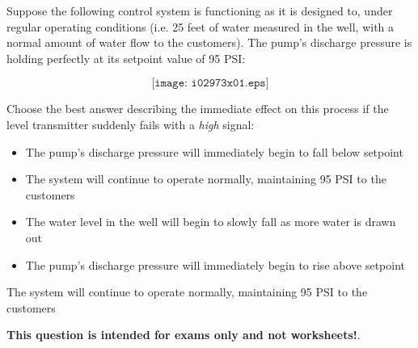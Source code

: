 

Suppose the following control system is functioning as it is designed to, under regular operating conditions (i.e. 25 feet of water measured in the well, with a normal amount of water flow to the customers).  The pump's discharge pressure is holding perfectly at its setpoint value of 95 PSI:

$$\texttt{[image: i02973x01.eps]}$$

\noindent
Choose the best answer describing the immediate effect on this process if the level transmitter suddenly fails with a {\it high} signal:

\begin{itemize}
\item{} The pump's discharge pressure will immediately begin to fall below setpoint
\vskip 10pt
\item{} The system will continue to operate normally, maintaining 95 PSI to the customers
\vskip 10pt
\item{} The water level in the well will begin to slowly fall as more water is drawn out
\vskip 10pt
\item{} The pump's discharge pressure will immediately begin to rise above setpoint
\end{itemize}







The system will continue to operate normally, maintaining 95 PSI to the customers







{\bf This question is intended for exams only and not worksheets!}.



